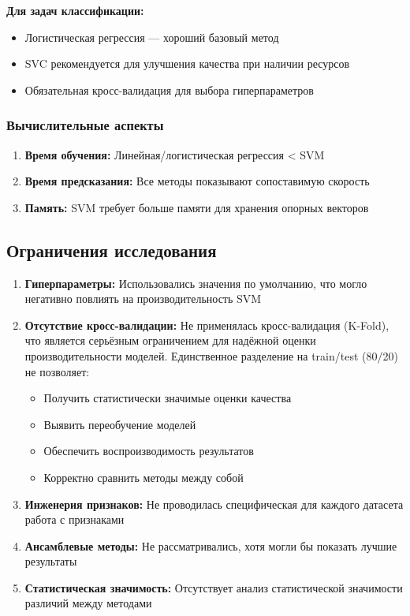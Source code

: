\documentclass[a4paper]{article}
\begin{document}
\textbf{Для задач классификации:}
\begin{itemize}
    \item Логистическая регрессия — хороший базовый метод
    \item SVC рекомендуется для улучшения качества при наличии ресурсов
    \item Обязательная кросс-валидация для выбора гиперпараметров
\end{itemize}

\subsubsection{Вычислительные аспекты}
\begin{enumerate}
    \item \textbf{Время обучения:} Линейная/логистическая регрессия < SVM
    \item \textbf{Время предсказания:} Все методы показывают сопоставимую скорость
    \item \textbf{Память:} SVM требует больше памяти для хранения опорных векторов
\end{enumerate}

\subsection{Ограничения исследования}

\begin{enumerate}
    \item \textbf{Гиперпараметры:} Использовались значения по умолчанию, что могло негативно повлиять на производительность SVM
    \item \textbf{Отсутствие кросс-валидации:} Не применялась кросс-валидация (K-Fold), что является серьёзным ограничением для надёжной оценки производительности моделей. Единственное разделение на train/test (80/20) не позволяет:
    \begin{itemize}
        \item Получить статистически значимые оценки качества
        \item Выявить переобучение моделей
        \item Обеспечить воспроизводимость результатов
        \item Корректно сравнить методы между собой
    \end{itemize}
    \item \textbf{Инженерия признаков:} Не проводилась специфическая для каждого датасета работа с признаками
    \item \textbf{Ансамблевые методы:} Не рассматривались, хотя могли бы показать лучшие результаты
    \item \textbf{Статистическая значимость:} Отсутствует анализ статистической значимости различий между методами
\end{enumerate}
\end{document}
